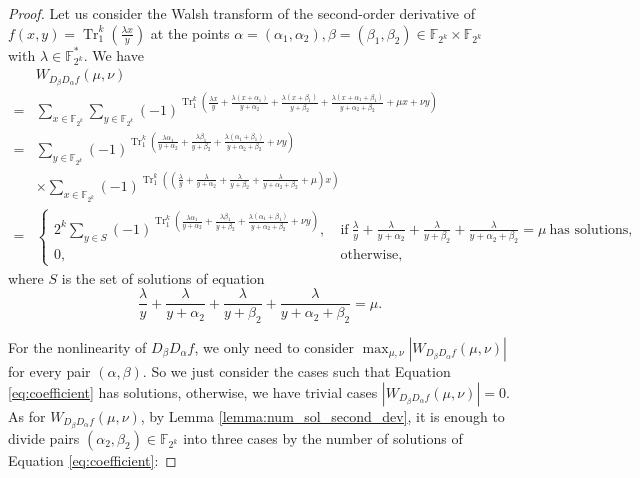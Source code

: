\documentclass{article}
\newcommand{\F}{\mathbb{F}}
\newcommand{\0}{\textbf{0}}
\newcommand{\1}{\textbf{1}}
\newcommand{\TRACE}{\operatorname{Tr}_1^k}
\theoremstyle{plain}
\begin{document}
    \begin{proof}
        Let us consider the Walsh transform of the second-order derivative of $f(x,y)=\TRACE\left(\frac{\lambda x}{y}\right)$ at the points $\alpha=(\alpha_1,\alpha_2),\beta=(\beta_1,\beta_2)\in\F_{2^k}\times\F_{2^k}$ with $\lambda\in\F_{2^k}^*$.
        We have
        \begin{align*}\label{eq:secondordersum}
            &W_{D_{\beta}D_{\alpha}f}(\mu,\nu)\nonumber\\
            =&\sum_{x\in\F_{2^k}}\sum_{y\in\F_{2^k}}(-1)^{\TRACE\left(\frac{\lambda x}{y}+\frac{\lambda (x+\alpha_1)}{y+\alpha_2}+\frac{\lambda (x+\beta_1)}{y+\beta_2}+\frac{\lambda (x+\alpha_1+\beta_1)}{y+\alpha_2+\beta_2}+\mu x+\nu y\right)}\nonumber\\
            =&\sum_{y\in\F_{2^k}}(-1)^{\TRACE\left(\frac{\lambda\alpha_1}{y+\alpha_2}+\frac{\lambda\beta_1}{y+\beta_2}+\frac{\lambda(\alpha_1+\beta_1)}{y+\alpha_2+\beta_2}+\nu y\right)}\nonumber\\
            &\times \sum_{x\in\F_{2^k}}(-1)^{\TRACE\left(\left(\frac{\lambda}{y}+\frac{\lambda}{y+\alpha_2}+\frac{\lambda}{y+\beta_2}+\frac{\lambda}{y+\alpha_2+\beta_2}+\mu\right)x\right)}\nonumber\\
            =&\begin{cases}
                2^k\sum_{y\in S}(-1)^{\TRACE\left(\frac{\lambda\alpha_1}{y+\alpha_2}+\frac{\lambda\beta_1}{y+\beta_2}+\frac{\lambda(\alpha_1+\beta_1)}{y+\alpha_2+\beta_2}+\nu y\right)},&~\text{if}~\frac{\lambda}{y}+\frac{\lambda}{y+\alpha_2}+\frac{\lambda}{y+\beta_2}+\frac{\lambda}{y+\alpha_2+\beta_2}=\mu~\text{has solutions},\\
                0, &~\text{otherwise},
            \end{cases}
        \end{align*}
        where $S$ is the set of solutions of equation
        \begin{equation}\label{eq:coefficient}
            \frac{\lambda}{y}+\frac{\lambda}{y+\alpha_2}+\frac{\lambda}{y+\beta_2}+\frac{\lambda}{y+\alpha_2+\beta_2}=\mu.
        \end{equation}

        For the nonlinearity of $D_{\beta}D_{\alpha}f$, we only need to consider $\max_{\mu,\nu}|W_{D_{\beta}D_{\alpha}f}(\mu,\nu)|$ for every pair $(\alpha,\beta)$.
        So we just consider the cases such that Equation \eqref{eq:coefficient} has solutions, otherwise, we have trivial cases $\left\lvert W_{D_{\beta}D_{\alpha}f}(\mu,\nu)\right\rvert=0$.
        As for $W_{D_{\beta}D_{\alpha}f}(\mu,\nu)$, by Lemma \ref{lemma:num_sol_second_dev}, it is enough to divide pairs $(\alpha_2,\beta_2)\in\F_{2^k}$ into three cases by the number of solutions
        of Equation \eqref{eq:coefficient}:


\end{proof}
\end{document}
